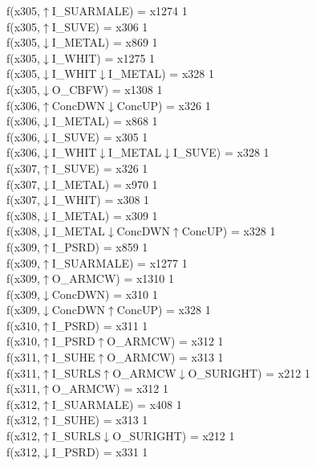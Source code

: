 f(x305,$\uparrow$I\_SUARMALE) = x1274 {1} \\
f(x305,$\uparrow$I\_SUVE) = x306 {1} \\
f(x305,$\downarrow$I\_METAL) = x869 {1} \\
f(x305,$\downarrow$I\_WHIT) = x1275 {1} \\
f(x305,$\downarrow$I\_WHIT$\downarrow$I\_METAL) = x328 {1} \\
f(x305,$\downarrow$O\_CBFW) = x1308 {1} \\
f(x306,$\uparrow$ConcDWN$\downarrow$ConcUP) = x326 {1} \\
f(x306,$\downarrow$I\_METAL) = x868 {1} \\
f(x306,$\downarrow$I\_SUVE) = x305 {1} \\
f(x306,$\downarrow$I\_WHIT$\downarrow$I\_METAL$\downarrow$I\_SUVE) = x328 {1} \\
f(x307,$\uparrow$I\_SUVE) = x326 {1} \\
f(x307,$\downarrow$I\_METAL) = x970 {1} \\
f(x307,$\downarrow$I\_WHIT) = x308 {1} \\
f(x308,$\downarrow$I\_METAL) = x309 {1} \\
f(x308,$\downarrow$I\_METAL$\downarrow$ConcDWN$\uparrow$ConcUP) = x328 {1} \\
f(x309,$\uparrow$I\_PSRD) = x859 {1} \\
f(x309,$\uparrow$I\_SUARMALE) = x1277 {1} \\
f(x309,$\uparrow$O\_ARMCW) = x1310 {1} \\
f(x309,$\downarrow$ConcDWN) = x310 {1} \\
f(x309,$\downarrow$ConcDWN$\uparrow$ConcUP) = x328 {1} \\
f(x310,$\uparrow$I\_PSRD) = x311 {1} \\
f(x310,$\uparrow$I\_PSRD$\uparrow$O\_ARMCW) = x312 {1} \\
f(x311,$\uparrow$I\_SUHE$\uparrow$O\_ARMCW) = x313 {1} \\
f(x311,$\uparrow$I\_SURLS$\uparrow$O\_ARMCW$\downarrow$O\_SURIGHT) = x212 {1} \\
f(x311,$\uparrow$O\_ARMCW) = x312 {1} \\
f(x312,$\uparrow$I\_SUARMALE) = x408 {1} \\
f(x312,$\uparrow$I\_SUHE) = x313 {1} \\
f(x312,$\uparrow$I\_SURLS$\downarrow$O\_SURIGHT) = x212 {1} \\
f(x312,$\downarrow$I\_PSRD) = x331 {1} \\
